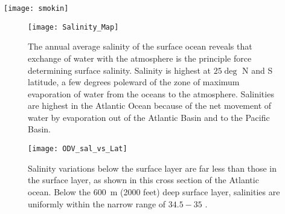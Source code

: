 {\newpage
\begin{sidewaysfigure}[ht]
\centering
    \texttt{[image: smokin]}
    \caption{Two examples of hydrothermal vents, spectacular examples of interactions between the oceans and the hot volcanic rocks found at mid-ocean ridges. On the left panel, super-heated water emerges from natural ``chimneys.''  The white solids form when hot fluids mix with cooler seawater, forming the chimneys. The white precipitates include compounds of barium, calcium and silicon. In the right panel, water at \SI{340}{\celsius} ($650\circ F$) emerges from a vent at a depth of \SI{2200}{\metre} ($7200\ ft$). The black precipitates are metal sulphides ($FeS$), which likely include iron, copper, manganese and zinc. When these ``black smoker'' vents were first discovered, it became clear that the world's most important copper deposits formed in similar locations in Earth's distant past. Credits: While from NOAA web sites, the copyright for thee mages is unclear. I do NOT yet have certain rights to these photographs. Left panel URL points to \href{http://oceanexplorer.noaa.gov/okeanos/explorations/10index/logs/slideshow/ex_july_highlights/gallery/hires/white_plumes_hires.jpg}{NOAA}, as does the right panel \href{http://oceanexplorer.noaa.gov/okeanos/explorations/10index/background/hires/boardwalk_black_smoker_hires.jpg}{URL}.}
    \label{fig:smokers}
\end{sidewaysfigure}

\newpage
\begin{figure}[p]
\centering
  \texttt{[image: Salinity\_Map]}%
\caption{The annual average salinity of the surface ocean reveals that exchange of water with the atmosphere is the principle force determining surface salinity. Salinity is highest at $25\deg$ N and S latitude, a few degrees poleward of the zone of maximum evaporation of water from the oceans to the atmosphere. Salinities are highest in the Atlantic Ocean because of the net movement of water by evaporation out of the Atlantic Basin and to the Pacific Basin. }
\label{fig:surf_salinity}
\end{figure}


\begin{figure}[p]
\centering
  \texttt{[image: ODV\_sal\_vs\_Lat]}%
\caption{Salinity variations below the surface layer are far less than those in the surface layer, as shown in this cross section of the Atlantic ocean. Below the \SI{600}{\metre} (2000 feet) deep surface layer, salinities are uniformly within the narrow range of $34.5-35$ \textperthousand.}  
\label{fig:salinity_sect}  
\end{figure}

}
